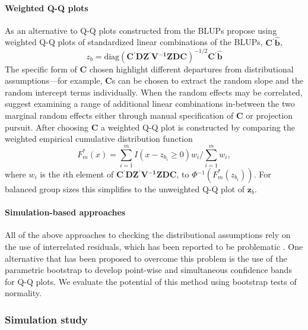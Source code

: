 \documentclass[12pt]{article} %
\newcommand{\inv}{\ensuremath{^{-1}}}
\newcommand{\trans}{\ensuremath{^\prime}}
\begin{document}
\paragraph{Weighted Q-Q plots}

As an alternative to Q-Q plots constructed from the BLUPs \cite{Lange:1989uu} propose using weighted Q-Q plots of standardized linear combinations of the BLUPs, $\bm{C\trans}\widehat{\bm{b}}$,
%
\begin{equation}
z_{b} = \text{diag} \left(\bm{C\trans DZ\trans V\inv ZDC}\right)^{-1/2} \bm{C\trans}\widehat{\bm{b}}
\end{equation}
%
The specific form of $\bm{C}$ chosen highlight different departures from distributional assumptions---for example, $\bm{C}$s can be chosen to extract the random slope and the random intercept terms individually. When the random effects may be correlated, \citeauthor{Lange:1989uu} suggest examining a range of additional linear combinations in-between the two marginal random effects either through manual specification of $\bm{C}$ or projection pursuit.
After choosing $\bm{C}$ a weighted Q-Q plot is constructed by comparing the weighted empirical cumulative distribution function
%
\begin{equation}
F_m^*(x) = \sum_{i=1}^{m} I(x - z_{b_i} \geq 0) w_i \bigg/ \sum_{i=1}^{m} w_i, 
\end{equation}
%
where $w_i$ is the $i$th element of $\bm{C\trans DZ\trans V\inv ZDC}$, to $\Phi\inv \left ( F_m^*(z_{b_i}) \right)$. For balanced group sizes this simplifies to the unweighted Q-Q plot of $\bm{z}_b$.
%

\paragraph{Simulation-based approaches}

All of the above approaches to checking the distributional assumptions rely on the use of interrelated residuals, which has been reported to be problematic \citep{HildenMinton:1995wh, Verbeke:1996va}.  
One alternative that has been proposed to overcome this problem is the use of the parametric bootstrap to develop point-wise and simultaneous confidence bands for Q-Q plots. We evaluate the potential of this method using bootstrap tests of normality.


\subsubsection{Simulation study}\label{supp:simstudy}
\end{document}
